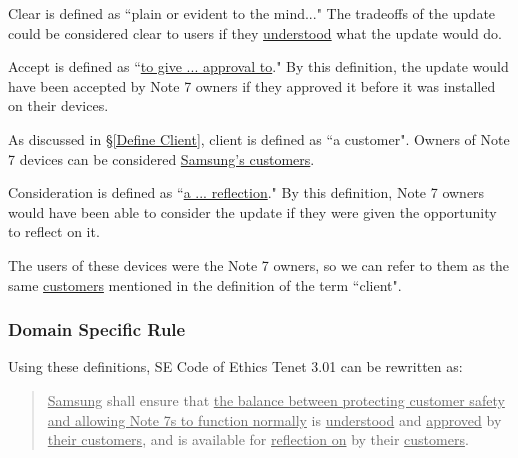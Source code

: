 \documentclass[12pt]{article}
\newcounter{subsubsubsection}[subsubsection]
\begin{document}
	Clear is defined as ``plain or evident to the mind..."\cite{freeDefineClear} The tradeoffs of the update could be considered clear to users if they \uline{understood} what the update would do.
      
      
      Accept is defined as ``\uline{to give ... approval to}."\cite{merriamDefineAccept} By this definition, the update would have been accepted by Note 7 owners if they approved it before it was installed on their devices.
      
      As discussed in \S\ref{Define Client}, client is defined as ``a customer"\cite{dictionaryDefineClient}. Owners of Note 7 devices can be considered \uline{Samsung's customers}.
      
      Consideration is defined as ``\uline{a ... reflection}."\cite{dictionaryDefineConsideration} By this definition, Note 7 owners would have been able to consider the update if they were given the opportunity to reflect on it.
      
      The users of these devices were the Note 7 owners, so we can refer to them as the same \uline{customers} mentioned in the definition of the term ``client".
   
   \subsubsection{Domain Specific Rule}
   Using these definitions, SE Code of Ethics Tenet 3.01 can be rewritten as:
   
   \begin{quote}
	\uline{Samsung} shall ensure that \uline{the balance between protecting customer safety and allowing Note 7s to function normally} is \uline{understood} and \uline{approved} by \uline{their customers}, and is available for \uline{reflection on} by their \uline{customers}.
   \end{quote}
  
\end{document}
